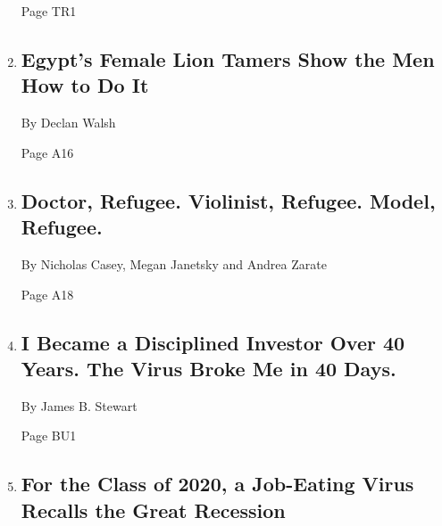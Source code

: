 \begin{enumerate}
  Page TR1
\item
  \href{/2020/03/29/world/middleeast/egypt-circuses-lions-women.html}{}

  \hypertarget{egypts-female-lion-tamers-show-the-men-how-to-do-it}{%
  \subsection{Egypt's Female Lion Tamers Show the Men How to Do
  It}\label{egypts-female-lion-tamers-show-the-men-how-to-do-it}}

  By Declan Walsh

  Page A16
\item
  \href{/2020/03/28/world/americas/doctor-refugee-violinist-refugee-model-refugee.html}{}

  \hypertarget{doctor-refugee-violinist-refugee-model-refugee}{%
  \subsection{Doctor, Refugee. Violinist, Refugee. Model,
  Refugee.}\label{doctor-refugee-violinist-refugee-model-refugee}}

  By Nicholas Casey, Megan Janetsky and Andrea Zarate

  Page A18
\item
  \href{/2020/03/27/business/stock-market-pandemic-coronavirus.html}{}

  \hypertarget{i-became-a-disciplined-investor-over-40-years-the-virus-broke-me-in-40-days}{%
  \subsection{I Became a Disciplined Investor Over 40 Years. The Virus
  Broke Me in 40
  Days.}\label{i-became-a-disciplined-investor-over-40-years-the-virus-broke-me-in-40-days}}

  By James B. Stewart

  Page BU1
\item
  \href{/2020/03/27/business/coronavirus-class-of-2020-jobs.html}{}

  \hypertarget{for-the-class-of-2020-a-job-eating-virus-recalls-the-great-recession}{%
  \subsection{For the Class of 2020, a Job-Eating Virus Recalls the
  Great
  Recession}\label{for-the-class-of-2020-a-job-eating-virus-recalls-the-great-recession}}


\end{enumerate}
